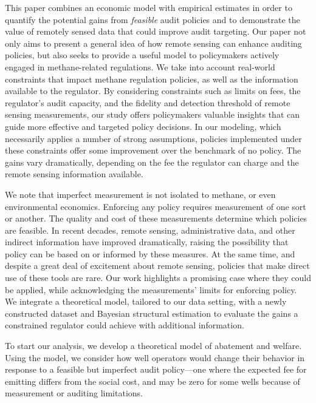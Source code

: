 \documentclass[12pt,oneside,letterpaper]{article}
\theoremstyle{definition}
\begin{document}
\begin{refsection}
This paper combines an economic model with empirical estimates in order to quantify the potential gains from \emph{feasible} audit policies and to demonstrate the value of remotely sensed data that could improve audit targeting.
Our paper not only aims to present a general idea of how remote sensing can enhance auditing policies, but also seeks to provide a useful model to policymakers actively engaged in methane-related regulations.
We take into account real-world constraints that impact methane regulation policies, as well as the information available to the regulator.
By considering constraints such as limits on fees, the regulator's audit capacity, and the fidelity and detection threshold of remote sensing measurements, our study offers policymakers valuable insights that can guide more effective and targeted policy decisions.
In our modeling, which necessarily applies a number of strong assumptions,
policies implemented under these constraints offer some improvement over the benchmark of no policy.
The gains vary dramatically, depending on the fee the regulator can charge and the remote sensing information available.


We note that imperfect measurement is not isolated to methane, or even environmental economics.
Enforcing any policy requires measurement of one sort or another.
The quality and cost of these measurements determine which policies are feasible.
In recent decades, remote sensing, administrative data, and other indirect information have improved dramatically, raising the possibility that policy can be based on or informed by these measures.
At the same time, and despite a great deal of excitement about remote sensing, policies that make direct use of these tools are rare.
Our work highlights a promising case where they could be applied, while acknowledging the measurements' limits for enforcing policy.
We integrate a theoretical model, tailored to our data setting, with a newly constructed dataset and Bayesian structural estimation to evaluate the gains a constrained regulator could achieve with additional information.

To start our analysis, we develop a theoretical model of abatement and welfare.
Using the model, we consider how well operators would change their behavior in response to a feasible but imperfect audit policy---one where the expected fee for emitting differs from the social cost,
and may be zero for some wells because of measurement or auditing limitations.


\end{refsection}
\end{document}
